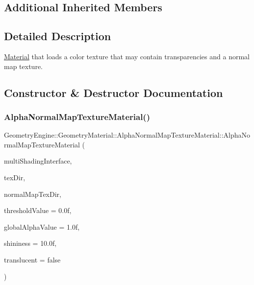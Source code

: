 \subsection*{Additional Inherited Members}


\subsection{Detailed Description}
\mbox{\hyperlink{class_geometry_engine_1_1_geometry_material_1_1_material}{Material}} that loads a color texture that may contain transparencies and a normal map texture. 

\subsection{Constructor \& Destructor Documentation}
\mbox{\label{class_geometry_engine_1_1_geometry_material_1_1_alpha_normal_map_texture_material_a0826154e4032d64ed979176f9a6c6ddf}} 
\subsubsection{\texorpdfstring{AlphaNormalMapTextureMaterial()}{AlphaNormalMapTextureMaterial()}\hspace{0.1cm}{\footnotesize\ttfamily [1/2]}}
{\footnotesize\ttfamily Geometry\+Engine\+::\+Geometry\+Material\+::\+Alpha\+Normal\+Map\+Texture\+Material\+::\+Alpha\+Normal\+Map\+Texture\+Material (\begin{DoxyParamCaption}\item[{const \mbox{\hyperlink{class_geometry_engine_1_1_custom_shading_1_1_multi_shading_interface}{Custom\+Shading\+::\+Multi\+Shading\+Interface}} $\ast$const}]{multi\+Shading\+Interface,  }\item[{const std\+::string \&}]{tex\+Dir,  }\item[{const std\+::string \&}]{normal\+Map\+Tex\+Dir,  }\item[{float}]{threshold\+Value = {\ttfamily 0.0f},  }\item[{float}]{global\+Alpha\+Value = {\ttfamily 1.0f},  }\item[{float}]{shininess = {\ttfamily 10.0f},  }\item[{bool}]{translucent = {\ttfamily false} }\end{DoxyParamCaption})}

